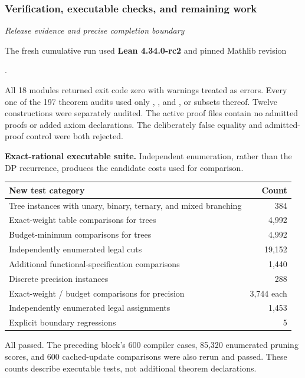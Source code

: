 \subsubsection*{Verification, executable checks, and remaining work}\label{history:supp3:subsection:007}\textit{Release evidence and precise completion boundary}\par
The fresh cumulative run used \textbf{Lean 4.34.0-rc2} and pinned Mathlib revision
\begin{center}.\end{center}
All 18 modules returned exit code zero with warnings treated as errors. Every one of the 197 theorem audits used only , , and , or subsets thereof. Twelve constructions were separately audited. The active proof files contain no admitted proofs or added axiom declarations. The deliberately false equality and admitted-proof control were both rejected.

\textbf{Exact-rational executable suite.} Independent enumeration, rather than the DP recurrence, produces the candidate costs used for comparison.
\begin{center}\small
\renewcommand{\arraystretch}{1.18}
\begin{tabular}{@{}p{}r@{}}
\toprule
New test category & Count\\
\midrule
Tree instances with unary, binary, ternary, and mixed branching & 384\\
Exact-weight table comparisons for trees & 4,992\\
Budget-minimum comparisons for trees & 4,992\\
Independently enumerated legal cuts & 19,152\\
Additional functional-specification comparisons & 1,440\\
Discrete precision instances & 288\\
Exact-weight / budget comparisons for precision & 3,744 each\\
Independently enumerated legal assignments & 1,453\\
Explicit boundary regressions & 5\\
\bottomrule
\end{tabular}
\end{center}
All passed. The preceding block's 600 compiler cases, 85,320 enumerated pruning scores, and 600 cached-update comparisons were also rerun and passed. These counts describe executable tests, not additional theorem declarations.

